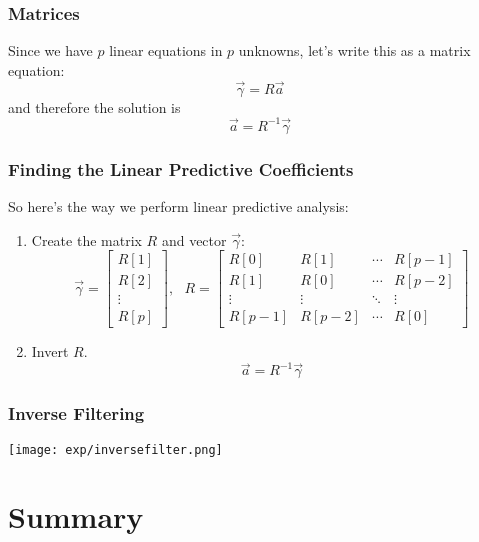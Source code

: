 \documentclass{beamer}
\begin{document}
\begin{frame}
  \frametitle{Matrices}

  Since we have $p$ linear equations in $p$ unknowns, let's write this
  as a matrix equation:
  \begin{displaymath}
    \vec\gamma = R \vec{a}
  \end{displaymath}
  and therefore the solution is
  \begin{displaymath}
    \vec{a} = R^{-1} \vec\gamma
  \end{displaymath}
\end{frame}

\begin{frame}
  \frametitle{Finding the Linear Predictive Coefficients}
  
  So here's the way we perform linear predictive analysis:
  \begin{enumerate}
  \item Create the matrix $R$ and vector $\vec\gamma$:
    \begin{displaymath}
      \vec\gamma = \left[\begin{array}{c}R[1]\\ R[2]\\\vdots\\ R[p]\end{array}\right],~~~
      R = \left[\begin{array}{cccc} R[0] & R[1] &  \cdots & R[p-1] \\
          R[1] & R[0] & \cdots & R[p-2] \\
          \vdots & \vdots & \ddots & \vdots \\
          R[p-1] & R[p-2] & \cdots & R[0] \end{array}\right]
    \end{displaymath}
  \item Invert $R$.
    \begin{displaymath}
      \vec{a} = R^{-1} \vec\gamma
    \end{displaymath}
  \end{enumerate}
\end{frame}

\begin{frame}
  \frametitle{Inverse Filtering}

  \centerline{\texttt{[image: exp/inversefilter.png]}}
\end{frame}


\section[Summary]{Summary}
\setcounter{subsection}{1}
\end{document}
